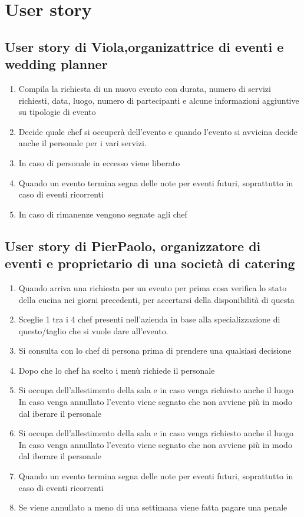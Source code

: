 \section{User story}

\subsection{User story di Viola,organizattrice di eventi e wedding planner}
\begin{enumerate}
  \item Compila la richiesta di un nuovo evento con durata, numero di servizi richiesti, data, luogo, numero di partecipanti e alcune informazioni aggiuntive su tipologie di evento
  \item Decide quale chef si occuperà dell'evento e quando l'evento si avvicina decide anche il personale per i vari servizi.
  \item In caso di personale in eccesso  viene liberato 
  \item Quando un evento termina segna delle note per eventi futuri, soprattutto in caso di eventi ricorrenti
  \item In caso di rimanenze vengono segnate agli chef
\end{enumerate}

\subsection{User story di PierPaolo, organizzatore di eventi e proprietario di una società di catering}
\begin{enumerate}
  \item  Quando arriva una richiesta per un evento per prima cosa verifica lo stato della cucina nei giorni precedenti, per accertarsi della disponibilità di questa 
  \item Sceglie 1 tra i 4 chef presenti nell'azienda in base alla specializzazione di questo/taglio che si vuole dare all'evento.
  \item Si consulta con lo chef di persona prima di prendere una qualsiasi decisione
  \item Dopo che lo chef ha scelto i menù richiede il personale 
  \item Si occupa dell'allestimento della sala e in caso venga richiesto anche il luogo
  In caso venga annullato l'evento viene segnato che non avviene più in modo dal iberare il personale
  \item Si occupa dell'allestimento della sala e in caso venga richiesto anche il luogo
  In caso venga annullato l'evento viene segnato che non avviene più in modo dal iberare il personale
 \item Quando un evento termina segna delle note per eventi futuri, soprattutto in caso di eventi ricorrenti  
 \item Se viene annullato a meno di una settimana viene fatta pagare una penale
\end{enumerate}

